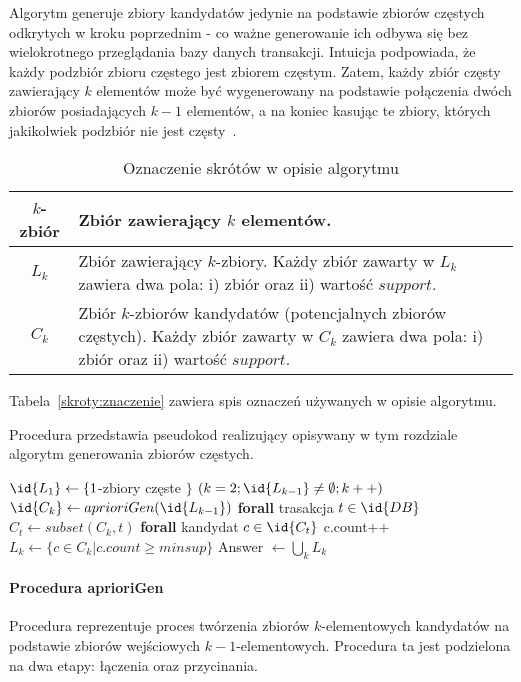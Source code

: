 Algorytm generuje zbiory kandydatów jedynie na podstawie zbiorów częstych odkrytych w kroku poprzednim - co ważne generowanie ich odbywa się bez wielokrotnego przeglądania bazy danych transakcji. Intuicja podpowiada, że każdy podzbiór zbioru częstego jest zbiorem częstym. Zatem, każdy zbiór częsty zawierający $k$ elementów może być wygenerowany na podstawie połączenia dwóch zbiorów posiadających $k-1$ elementów, a na koniec kasując te zbiory, których jakikolwiek podzbiór nie jest częsty~\cite{Apriori:Main}.

\begin{table}
	\centering
	\begin{tabular}{|c|p{7.7cm}|} \hline
	$k$-zbiór & Zbiór zawierający $k$ elementów. \\ \hline
	$L_k$ & Zbiór zawierający $k$-zbiory. Każdy zbiór zawarty w $L_k$ zawiera dwa pola: i) zbiór oraz ii) wartość $support$. \\ \hline
	$C_k$ & Zbiór $k$-zbiorów kandydatów (potencjalnych zbiorów częstych). Każdy zbiór zawarty w $C_k$ zawiera dwa pola: i) zbiór oraz ii) wartość $support$. \\ \hline
	\end{tabular}
	\caption{Oznaczenie skrótów w opisie algorytmu}\label{skroty:znaczanie}
\end{table}

Tabela~\ref{skroty:znaczenie} zawiera spis oznaczeń używanych w opisie algorytmu. 

Procedura  przedstawia pseudokod realizujący opisywany w tym rozdziale algorytm generowania zbiorów częstych.

\begin{codebox}
	\label{apriori:listing}
	\li $\id{L_1} \gets \lbrace 1$-zbiory częste $\rbrace$
		\li \For $(k = 2; \id{L_{k-1}} \neq \emptyset; k++)$
		\li \Do
			\li $\id{C_k} \gets aprioriGen(\id{L_{k-1}})$
			\li \textbf{forall} trasakcja $t \in \id{DB}$
			\li \Do
					\li $C_t \gets subset(C_k, t)$
					\li \textbf{forall} kandydat $c \in \id{C_t}$
					\li \Do c.count++
					\End
				\End
			\li $L_k \gets \lbrace c \in C_k | c.count \geq minsup \rbrace$	
		\End
	\li Answer $\gets \bigcup_k L_k $
\end{codebox}

\paragraph{Procedura aprioriGen}
Procedura  reprezentuje proces twórzenia zbiorów $k$-elementowych kandydatów na podstawie zbiorów wejściowych ${k-1}$-elementowych. Procedura ta jest podzielona na dwa etapy: łączenia oraz przycinania. 

